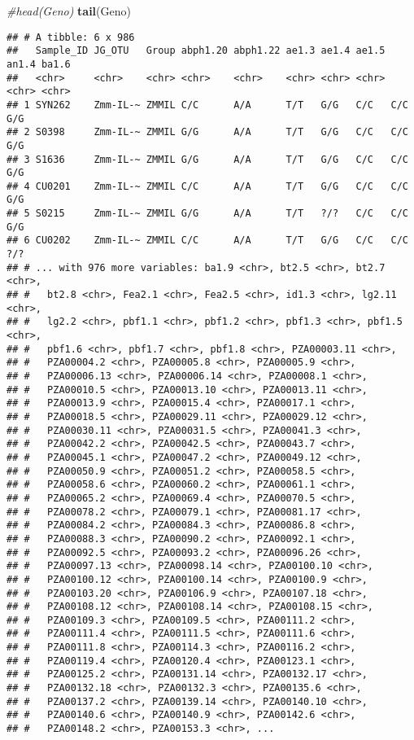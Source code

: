 \documentclass[]{article}
\newenvironment{Shaded}{\begin{snugshade}}{\end{snugshade}}
\newcommand{\KeywordTok}[1]{\textcolor[rgb]{0.13,0.29,0.53}{\textbf{#1}}}
\newcommand{\CommentTok}[1]{\textcolor[rgb]{0.56,0.35,0.01}{\textit{#1}}}
\newcommand{\NormalTok}[1]{#1}
\begin{document}
\begin{Shaded}
\begin{Highlighting}[]
\CommentTok{#head(Geno)}
\KeywordTok{tail}\NormalTok{(Geno)}
\end{Highlighting}
\end{Shaded}

\begin{verbatim}
## # A tibble: 6 x 986
##   Sample_ID JG_OTU   Group abph1.20 abph1.22 ae1.3 ae1.4 ae1.5 an1.4 ba1.6
##   <chr>     <chr>    <chr> <chr>    <chr>    <chr> <chr> <chr> <chr> <chr>
## 1 SYN262    Zmm-IL-~ ZMMIL C/C      A/A      T/T   G/G   C/C   C/C   G/G  
## 2 S0398     Zmm-IL-~ ZMMIL G/G      A/A      T/T   G/G   C/C   C/C   G/G  
## 3 S1636     Zmm-IL-~ ZMMIL G/G      A/A      T/T   G/G   C/C   C/C   G/G  
## 4 CU0201    Zmm-IL-~ ZMMIL C/C      A/A      T/T   G/G   C/C   C/C   G/G  
## 5 S0215     Zmm-IL-~ ZMMIL G/G      A/A      T/T   ?/?   C/C   C/C   G/G  
## 6 CU0202    Zmm-IL-~ ZMMIL C/C      A/A      T/T   G/G   C/C   C/C   ?/?  
## # ... with 976 more variables: ba1.9 <chr>, bt2.5 <chr>, bt2.7 <chr>,
## #   bt2.8 <chr>, Fea2.1 <chr>, Fea2.5 <chr>, id1.3 <chr>, lg2.11 <chr>,
## #   lg2.2 <chr>, pbf1.1 <chr>, pbf1.2 <chr>, pbf1.3 <chr>, pbf1.5 <chr>,
## #   pbf1.6 <chr>, pbf1.7 <chr>, pbf1.8 <chr>, PZA00003.11 <chr>,
## #   PZA00004.2 <chr>, PZA00005.8 <chr>, PZA00005.9 <chr>,
## #   PZA00006.13 <chr>, PZA00006.14 <chr>, PZA00008.1 <chr>,
## #   PZA00010.5 <chr>, PZA00013.10 <chr>, PZA00013.11 <chr>,
## #   PZA00013.9 <chr>, PZA00015.4 <chr>, PZA00017.1 <chr>,
## #   PZA00018.5 <chr>, PZA00029.11 <chr>, PZA00029.12 <chr>,
## #   PZA00030.11 <chr>, PZA00031.5 <chr>, PZA00041.3 <chr>,
## #   PZA00042.2 <chr>, PZA00042.5 <chr>, PZA00043.7 <chr>,
## #   PZA00045.1 <chr>, PZA00047.2 <chr>, PZA00049.12 <chr>,
## #   PZA00050.9 <chr>, PZA00051.2 <chr>, PZA00058.5 <chr>,
## #   PZA00058.6 <chr>, PZA00060.2 <chr>, PZA00061.1 <chr>,
## #   PZA00065.2 <chr>, PZA00069.4 <chr>, PZA00070.5 <chr>,
## #   PZA00078.2 <chr>, PZA00079.1 <chr>, PZA00081.17 <chr>,
## #   PZA00084.2 <chr>, PZA00084.3 <chr>, PZA00086.8 <chr>,
## #   PZA00088.3 <chr>, PZA00090.2 <chr>, PZA00092.1 <chr>,
## #   PZA00092.5 <chr>, PZA00093.2 <chr>, PZA00096.26 <chr>,
## #   PZA00097.13 <chr>, PZA00098.14 <chr>, PZA00100.10 <chr>,
## #   PZA00100.12 <chr>, PZA00100.14 <chr>, PZA00100.9 <chr>,
## #   PZA00103.20 <chr>, PZA00106.9 <chr>, PZA00107.18 <chr>,
## #   PZA00108.12 <chr>, PZA00108.14 <chr>, PZA00108.15 <chr>,
## #   PZA00109.3 <chr>, PZA00109.5 <chr>, PZA00111.2 <chr>,
## #   PZA00111.4 <chr>, PZA00111.5 <chr>, PZA00111.6 <chr>,
## #   PZA00111.8 <chr>, PZA00114.3 <chr>, PZA00116.2 <chr>,
## #   PZA00119.4 <chr>, PZA00120.4 <chr>, PZA00123.1 <chr>,
## #   PZA00125.2 <chr>, PZA00131.14 <chr>, PZA00132.17 <chr>,
## #   PZA00132.18 <chr>, PZA00132.3 <chr>, PZA00135.6 <chr>,
## #   PZA00137.2 <chr>, PZA00139.14 <chr>, PZA00140.10 <chr>,
## #   PZA00140.6 <chr>, PZA00140.9 <chr>, PZA00142.6 <chr>,
## #   PZA00148.2 <chr>, PZA00153.3 <chr>, ...
\end{verbatim}
\end{document}
